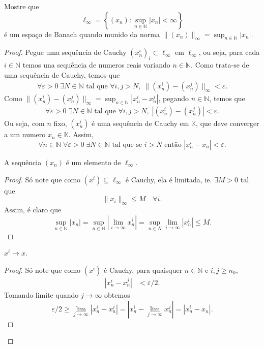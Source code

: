 \documentclass[portuguese]{article}
\theoremstyle{definition}
\newcommand{\N}{\mathbb{N}}
\begin{document}
	\begin{exer*}[2]
		Mostre que
		\[\ell_\infty=\left\{(x_n):\sup_{n\in\N}|x_n|<\infty\right\}\]
		é um espaço de Banach quando munido da norma $\|(x_n)\|_\infty=\sup_{n\in\N}|x_n|$.
	\end{exer*}
	\begin{proof}
		Pegue uma sequência de Cauchy $(x^i_n)_i\subset\ell_\infty$ em $\ell_\infty$, ou seja, para cada $i\in\N$ temos una sequência de numeros reais variando $n\in\N$. Como trata-se de uma sequência de Cauchy, temos que
		\begin{gather*}
			\forall\varepsilon>0\;\exists N\in\N\text{ tal que }\forall i,j>N,\;\| (x^i_n)-(x^j_n)\|_\infty<\varepsilon.
		\end{gather*}
		Como $\| (x^i_n)-(x^j_n)\|_\infty=\sup_{n\in\N}|x^i_n-x^j_n|$, pegando $n\in\N$, temos que
		\begin{gather*}
			\forall\varepsilon>0\;\exists N\in\N\text{ tal que }\forall i,j>N,\; |(x^i_n)-(x^j_n)|<\varepsilon.
		\end{gather*}
		Ou seja, com $n$ fixo, $(x^i_n)$ é uma sequência de Cauchy em $\mathbb{K}$, que deve converger a um numero $x_n\in\mathbb{K}$. Assim,
		\[\forall n\in\N\;\forall\varepsilon>0\;\exists N\in\N\text{ tal que se }i>N\text{ então }|x_n^i-x_n|<\varepsilon.\]
		
		\begin{af*}
			A sequência $(x_n)$ é um elemento de $\ell_\infty$.
		\end{af*}
		\begin{proof}
			Só note que como $(x^i)\subseteq\ell_\infty$ é Cauchy, ela é limitada, ie. $\exists M>0$ tal que
			\[\| x_ i\|_\infty\leq M\quad\forall i.\]
			Assim, é claro que
			\[\sup_{n\in\N}|x_n|=\sup_{n\in\N}\left|\lim_{i\to\infty}x^i_n\right|=\sup_{n\in N}\lim_{i\to\infty}|x^i_n|\leq M.\]
		\end{proof}
		\begin{af*}
			$x^i\to x$.
		\end{af*}
		\begin{proof}
			Só note que como $(x^i)$ é Cauchy, para quaisquer $n\in\N$ e $i,j\geq n_0$,
			\begin{align*}
				|x^i_n-x^j_n|&<\varepsilon/2.
			\end{align*}
			Tomando limite quando $j\to\infty$ obtemos
			\[\varepsilon/2\geq\lim_{j\to\infty}|x^i_n-x^j_n|=\left|x_n^i-\lim_{j\to\infty}x^j_n\right|=|x_n^i-x_n|.\]
		\end{proof}
	\end{proof}
	
\end{document}
